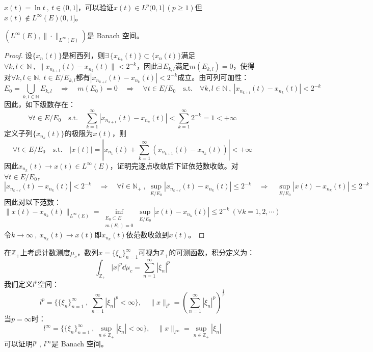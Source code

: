 \begin{example}
\quad $x(t)=\ln t \ , \ t \in (0,1]$，可以验证$x(t) \in L^p(0,1] \ (p \geq 1)$但$x(t) \notin L^{\infty}(E)(0,1]$。
\end{example}

\begin{theorem}
    $(L^{\infty}(E),\|\cdot\|_{L^{\infty}(E)})$是 Banach 空间。
\end{theorem}
\begin{proof}
设$\{x_n(t)\}$是柯西列，则$\exists \, \{x_{n_{k}}(t)\} \subset \{x_n(t)\}$满足$\forall k,l \in \mathbb{N} \ , \ \|x_{n_{k+l}}(t)-x_{n_{k}}(t)\|<2^{-k}$，因此$\exists \, E_{k,l}$满足$m(E_{k,l})=0$，使得对$\forall k,l \in \mathbb{N}, \ t \in E/E_{k,l}$都有$|x_{n_{k+l}}(t)-x_{n_{k}}(t)|<2^{-k}$成立。由可列可加性：
\[E_0=\bigcup_{k,l\in \mathbb{N}}E_{k,l} \quad \Rightarrow \quad m(E_0)=0 \quad \Rightarrow \quad \forall t \in E/E_0 \quad \text{s.t.} \quad \forall k,l \in \mathbb{N} \ , \ |x_{n_{k+l}}(t)-x_{n_{k}}(t)|<2^{-k}\]
因此，如下级数存在：
\[\forall t \in E/E_0 \quad \text{s.t.} \quad \sum_{k=1}^{\infty}|x_{n_{k+1}}(t)-x_{n_{k}}(t)|<\sum_{k=1}^{\infty}2^{-k}=1<+\infty\]
定义子列$\{x_{n_k}(t)\}$的极限为$x(t)$，则
\[\forall t \in E/E_0 \quad \text{s.t.} \quad |x(t)|=\left|x_{n_1}(t)+\sum_{k=1}^{\infty}(x_{n_{k+1}}(t)-x_{n_{k}}(t))\right|<+\infty\]
因此$x_{n_k}(t) \to x(t)\in L^{\infty}(E)$，证明完逐点收敛后下证依范数收敛。对$\forall t \in E/E_0$，
\[|x_{n_{k+l}}(t)-x_{n_{k}}(t)|<2^{-k} \quad \Rightarrow \quad \forall l \in \mathbb{N}_+ \ , \  \mathop \text{sup}\limits_{E/E_0}|x_{n_{k+l}}(t)-x_{n_{k}}(t)| \leq 2^{-k} \quad \Rightarrow \quad \mathop \text{sup}\limits_{E/E_0}|x(t)-x_{n_{k}}(t)| \leq 2^{-k}\]
因此对以下范数：
\[\|x(t)-x_{n_k}(t)\|_{L^{\infty}(E)}=\mathop \text{inf}\limits_{\substack{E_0 \subset E \\ m(E_0)=0}} \mathop \text{sup}\limits_{E/E_0}|x(t)-x_{n_{k}}(t)| \leq 2^{-k} \ (\forall k=1,2,\cdots)\]
令$k \to \infty \ , \ x_{n_k}(t) \to x(t)$即$x_{n_k}(t)$依范数收敛到$x(t)$。
\end{proof}

\begin{definition}[离散化的$L^p$空间：$l^p$]
在$\mathbb{Z}_+$上考虑计数测度$\mu_c$，数列$x=\{\xi_n\}_{n=1}^{\infty}$可视为$\mathbb{Z}_+$的可测函数，积分定义为：
\[\int_{\mathbb{Z}_+}|x|^p\dd\mu_c=\sum_{n=1}^{\infty}|\xi_n|^p\]
我们定义$l^p$空间：
\[l^p=\{\{\xi_n\}_{n=1}^{\infty} \ , \ \sum_{n=1}^{\infty}|\xi_n|^p<\infty\}, \quad \|x\|_{l^p}=\left(\sum_{n=1}^{\infty}|\xi_n|^p\right)^{\frac{1}{p}}\]
当$p=\infty$时：
\[l^{\infty}=\{\{\xi_n\}_{n=1}^{\infty} \ , \ \mathop \text{sup}\limits_{n \in \mathbb{Z}_+}|\xi_n|<\infty\}, \quad \|x\|_{l^{\infty}}=\mathop \text{sup}\limits_{n \in \mathbb{Z}_+}|\xi_n|\]
可以证明$l^p \ , \ l^{\infty}$是 Banach 空间。
\end{definition}

